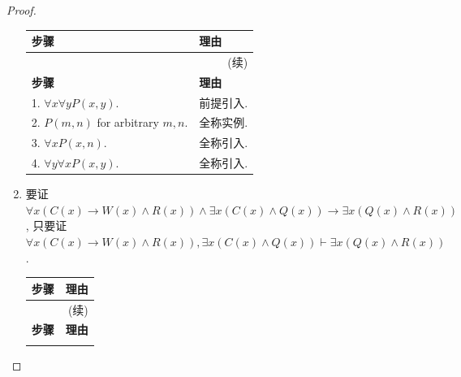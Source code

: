 \documentclass[10pt,UTF8]{book} %
\begin{document}
\begin{example}
\begin{proof}
\begin{enumerate}[label={$\left.\arabic*\right)$}, itemsep=0pt]
            {\begin{longtable}{p{}p{}}
                \toprule
                \textbf{步骤} & \textbf{理由} \\
                \midrule
                \endfirsthead
    
                \multicolumn{2}{r}{(续)} \\
                \toprule
                \textbf{步骤} & \textbf{理由} \\
                \midrule
                \endhead
            \bottomrule
            \endfoot
            
            1. $\forall x \forall y P(x,y)$. & 前提引入. \\ 
            2. $P(m,n)$ for arbitrary $m,n$. & 全称实例. \\ 
            3. $\forall x P(x,n)$. & 全称引入. \\ 
            4. $\forall y \forall x P(x,y)$. & 全称引入. \\
            \end{longtable}}

            \item 要证 $\forall x \left( C(x) \to W(x) \wedge R(x) \right) \wedge
            \exists x \left(
                C(x) \wedge Q(x)
            \right) \to \exists x \left(
                Q(x) \wedge R(x)
            \right)$, 
            \newline 只要证 $\forall x \left( C(x) \to W(x) \wedge R(x) \right),
            \exists x \left(
                C(x) \wedge Q(x)
            \right) \vdash \exists x \left(
                Q(x) \wedge R(x)
            \right)$.

            {\begin{longtable}{p{}p{}}
                \toprule
                \textbf{步骤} & \textbf{理由} \\
                \midrule
                \endfirsthead
    
                \multicolumn{2}{r}{(续)} \\
                \toprule
                \textbf{步骤} & \textbf{理由} \\
                \midrule
                \endhead
                
                \bottomrule
                \endfoot
            

\end{longtable}}
\end{enumerate}
\end{proof}
\end{example}
\end{document}
